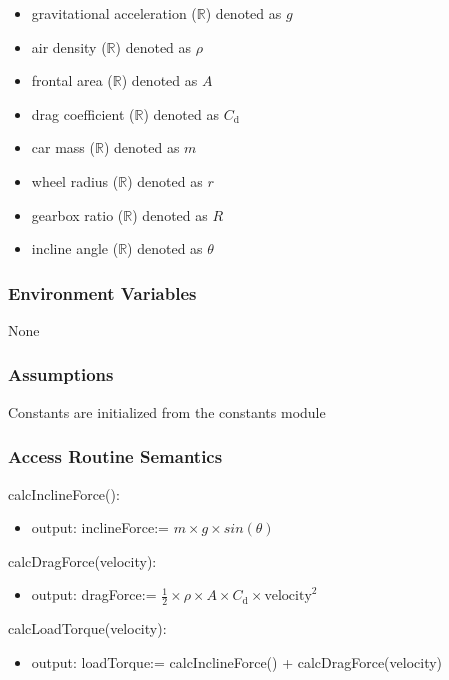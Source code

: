 \documentclass[12pt, titlepage]{article}
\begin{document}
\begin{itemize}
  \item gravitational acceleration ($\mathbb{R}$) denoted as $g$
  \item air density ($\mathbb{R}$) denoted as $\rho$
  \item frontal area ($\mathbb{R}$) denoted as $A$
  \item drag coefficient ($\mathbb{R}$) denoted as $C_{\text{d}}$
  \item car mass ($\mathbb{R}$) denoted as $m$
  \item wheel radius ($\mathbb{R}$) denoted as $r$
  \item gearbox ratio ($\mathbb{R}$) denoted as $R$
  \item incline angle ($\mathbb{R}$) denoted as $\theta$
\end{itemize}

\subsubsection{Environment Variables}

None

\subsubsection{Assumptions}

Constants are initialized from the constants module

\subsubsection{Access Routine Semantics}

\noindent calcInclineForce():
\begin{itemize}
\item output: inclineForce:= $m \times g \times sin(\theta)$
\end{itemize}

\noindent calcDragForce(velocity):
\begin{itemize}
\item output: dragForce:= $\frac{1}{2} \times \rho \times A \times C_{\text{d}} \times \text{velocity}^2$
\end{itemize}

\noindent calcLoadTorque(velocity):
\begin{itemize}
\item output: loadTorque:= calcInclineForce() + calcDragForce(velocity)
\end{itemize}
\end{document}
